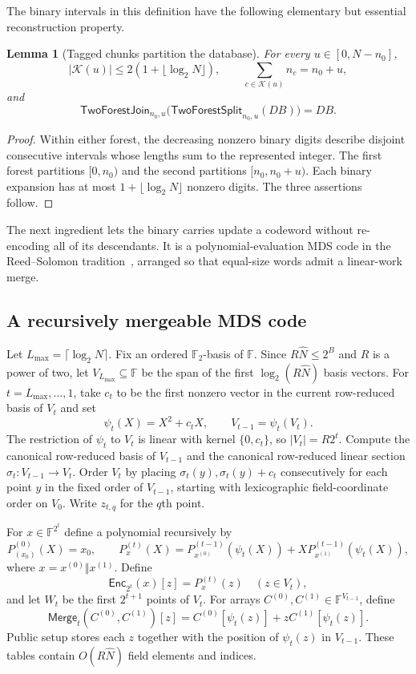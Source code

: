 \documentclass[11pt]{article}
\newtheorem{lemma}{Lemma}[section]
\begin{document}
The binary intervals in this definition have the following elementary but
essential reconstruction property.

\begin{lemma}[Tagged chunks partition the database]
\label{lem:partition}
For every $u\in[0,N-n_0]$,
\[
 |\mathcal K(u)|\le2(1+\lfloor\log_2N\rfloor),\qquad
 \sum_{c\in\mathcal K(u)}n_c=n_0+u,
\]
and
\[
 \mathsf{TwoForestJoin}_{n_0,u}
 \bigl(\mathsf{TwoForestSplit}_{n_0,u}(\mathit{DB})\bigr)=\mathit{DB}.
\]
\end{lemma}

\begin{proof}
Within either forest, the decreasing nonzero binary digits describe disjoint
consecutive intervals whose lengths sum to the represented integer.  The first
forest partitions $[0,n_0)$ and the second partitions $[n_0,n_0+u)$.  Each
binary expansion has at most $1+\lfloor\log_2N\rfloor$ nonzero digits.  The
three assertions follow.
\end{proof}

The next ingredient lets the binary carries update a codeword without
re-encoding all of its descendants.  It is a polynomial-evaluation MDS code in
the Reed--Solomon tradition~\cite{ReedSolomon1960PolynomialCodes}, arranged so
that equal-size words admit a linear-work merge.

\subsection{A recursively mergeable MDS code}

Let $L_{\max}=\lceil\log_2N\rceil$.  Fix an ordered
$\mathbb F_2$-basis of $\mathbb F$.
Since $R\widehat N\le2^B$ and $R$ is a power of two, let
$V_{L_{\max}}\subseteq\mathbb F$ be the span of the first
$\log_2(R\widehat N)$ basis vectors.  For $t=L_{\max},\ldots,1$, take $c_t$
to be the first nonzero vector in the current row-reduced basis of $V_t$ and
set
\[
 \psi_t(X)=X^2+c_tX,\qquad V_{t-1}=\psi_t(V_t).
\]
The restriction of $\psi_t$ to $V_t$ is linear with kernel $\{0,c_t\}$, so
$|V_t|=R2^t$.  Compute the canonical row-reduced basis of $V_{t-1}$ and the
canonical row-reduced linear section $\sigma_t:V_{t-1}\to V_t$.  Order $V_t$
by placing $\sigma_t(y),\sigma_t(y)+c_t$ consecutively for each point $y$ in
the fixed order of $V_{t-1}$, starting with lexicographic field-coordinate
order on $V_0$.  Write $z_{t,q}$ for the $q$th point.

For $x\in\mathbb F^{2^t}$ define a polynomial recursively by
\[
 P_{(x_0)}^{(0)}(X)=x_0,\qquad
 P_x^{(t)}(X)=P_{x^{(0)}}^{(t-1)}(\psi_t(X))
       +X P_{x^{(1)}}^{(t-1)}(\psi_t(X)),
\tag{4}\label{eq:additive-polynomial}
\]
where $x=x^{(0)}\Vert x^{(1)}$.  Define
\[
 \mathsf{Enc}_{2^t}(x)[z]=P_x^{(t)}(z)\quad(z\in V_t),
\]
and let $W_t$ be the first $2^{t+1}$ points of $V_t$.  For arrays
$C^{(0)},C^{(1)}\in\mathbb F^{V_{t-1}}$, define
\[
 \mathsf{Merge}_t(C^{(0)},C^{(1)})[z]
 =C^{(0)}[\psi_t(z)]+zC^{(1)}[\psi_t(z)].
\tag{5}\label{eq:merge}
\]
Public setup stores each $z$ together with the position of $\psi_t(z)$ in
$V_{t-1}$.  These tables contain $O(R\widehat N)$ field elements and indices.
\end{document}
